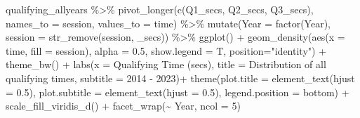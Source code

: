 \documentclass[
]{book}
\newenvironment{Shaded}{\begin{snugshade}}{\end{snugshade}}
\newcommand{\AttributeTok}[1]{\textcolor[rgb]{0.77,0.63,0.00}{#1}}
\newcommand{\DecValTok}[1]{\textcolor[rgb]{0.00,0.00,0.81}{#1}}
\newcommand{\FloatTok}[1]{\textcolor[rgb]{0.00,0.00,0.81}{#1}}
\newcommand{\FunctionTok}[1]{\textcolor[rgb]{0.00,0.00,0.00}{#1}}
\newcommand{\NormalTok}[1]{#1}
\newcommand{\SpecialCharTok}[1]{\textcolor[rgb]{0.00,0.00,0.00}{#1}}
\newcommand{\StringTok}[1]{\textcolor[rgb]{0.31,0.60,0.02}{#1}}
\begin{document}
\begin{Shaded}
\begin{Highlighting}[]
\NormalTok{qualifying\_allyears }\SpecialCharTok{\%\textgreater{}\%}
  \FunctionTok{pivot\_longer}\NormalTok{(}\FunctionTok{c}\NormalTok{(}\StringTok{\textquotesingle{}Q1\_secs\textquotesingle{}}\NormalTok{, }\StringTok{\textquotesingle{}Q2\_secs\textquotesingle{}}\NormalTok{, }\StringTok{\textquotesingle{}Q3\_secs\textquotesingle{}}\NormalTok{),}
               \AttributeTok{names\_to =} \StringTok{\textquotesingle{}session\textquotesingle{}}\NormalTok{,}
               \AttributeTok{values\_to =} \StringTok{\textquotesingle{}time\textquotesingle{}}\NormalTok{) }\SpecialCharTok{\%\textgreater{}\%}
  \FunctionTok{mutate}\NormalTok{(}\AttributeTok{Year =} \FunctionTok{factor}\NormalTok{(Year),}
         \AttributeTok{session =} \FunctionTok{str\_remove}\NormalTok{(session, }\StringTok{\textquotesingle{}\_secs\textquotesingle{}}\NormalTok{)) }\SpecialCharTok{\%\textgreater{}\%}
  \FunctionTok{ggplot}\NormalTok{() }\SpecialCharTok{+}
  \FunctionTok{geom\_density}\NormalTok{(}\FunctionTok{aes}\NormalTok{(}\AttributeTok{x =}\NormalTok{ time, }\AttributeTok{fill =}\NormalTok{ session),}
                 \AttributeTok{alpha =} \FloatTok{0.5}\NormalTok{, }\AttributeTok{show.legend =}\NormalTok{ T,}
                 \AttributeTok{position=}\StringTok{"identity"}\NormalTok{) }\SpecialCharTok{+}
  \FunctionTok{theme\_bw}\NormalTok{() }\SpecialCharTok{+}
  \FunctionTok{labs}\NormalTok{(}\AttributeTok{x =} \StringTok{\textquotesingle{}Qualifying Time (secs)\textquotesingle{}}\NormalTok{,}
       \AttributeTok{title =} \StringTok{\textquotesingle{}Distribution of all qualifying times\textquotesingle{}}\NormalTok{,}
       \AttributeTok{subtitle =} \StringTok{\textquotesingle{}2014 {-} 2023\textquotesingle{}}\NormalTok{)}\SpecialCharTok{+}
  \FunctionTok{theme}\NormalTok{(}\AttributeTok{plot.title =} \FunctionTok{element\_text}\NormalTok{(}\AttributeTok{hjust =} \FloatTok{0.5}\NormalTok{),}
        \AttributeTok{plot.subtitle =} \FunctionTok{element\_text}\NormalTok{(}\AttributeTok{hjust =} \FloatTok{0.5}\NormalTok{),}
        \AttributeTok{legend.position =} \StringTok{\textquotesingle{}bottom\textquotesingle{}}\NormalTok{) }\SpecialCharTok{+}
  \FunctionTok{scale\_fill\_viridis\_d}\NormalTok{() }\SpecialCharTok{+}
  \FunctionTok{facet\_wrap}\NormalTok{(}\SpecialCharTok{\textasciitilde{}}\NormalTok{ Year, }\AttributeTok{ncol =} \DecValTok{5}\NormalTok{)}
\end{Highlighting}
\end{Shaded}
\end{document}
